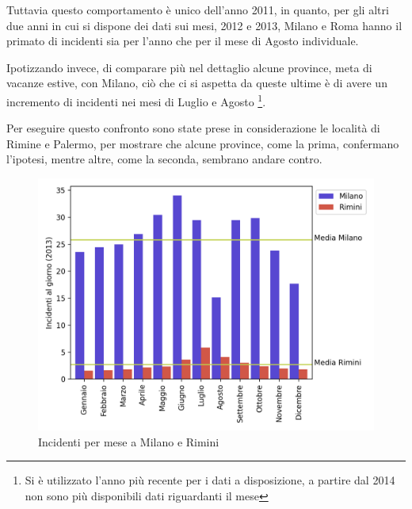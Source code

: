 \documentclass[a4paper]{report}
\begin{document}
Tuttavia questo comportamento è unico dell'anno 2011, in quanto, per gli altri due anni in cui 
si dispone dei dati sui mesi, 2012 e 2013, Milano e Roma hanno il primato di 
incidenti sia per l'anno che per il mese di Agosto individuale.

Ipotizzando invece, di comparare più nel dettaglio alcune province, meta di vacanze estive, 
con Milano, ciò che ci si aspetta da queste ultime è di avere un incremento di incidenti nei mesi 
di Luglio e Agosto
\footnote{Si è utilizzato l'anno più recente per i dati a disposizione, a partire dal 2014 non sono 
più disponibili dati riguardanti il mese}.

Per eseguire questo confronto sono state prese in considerazione le località di Rimine e Palermo, 
per mostrare che alcune province, come la prima, confermano l'ipotesi, mentre altre, come la seconda, 
sembrano andare contro.

\begin{figure}
    \includegraphics[width=\linewidth]{../src/incidenti/incidenti_senza_coords/mese_incidenti/milano_rimini.png}
    \caption{Incidenti per mese a Milano e Rimini}
    \label{fig:milano-rimini}
\end{figure}
\end{document}
